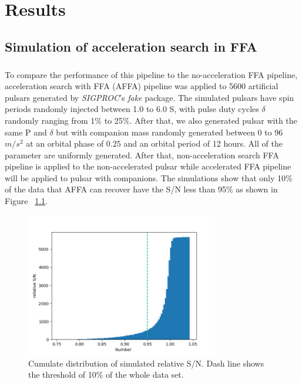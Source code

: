 \documentclass[thesis_msc.tex]{subfiles}
\begin{document}
\chapter{Results}
	\section{Simulation of acceleration search in FFA } \label{AFFA}
  \paragraph{} To compare the performance of this pipeline to the no-acceleration FFA pipeline, acceleration search with FFA (AFFA) pipeline was applied to 5600 artificial pulsars generated by \textit{SIGPROC}'s \textit{fake} package. The simulated pulsars have spin periods randomly injected between 1.0 to 6.0 S, with pulse duty cycles $\delta$ randomly ranging from 1\% to 25\%. After that, we also generated pulsar with the same P and $\delta$ but with companion mass randomly generated between 0 to 96 $m/s^2$ at an orbital phase of 0.25 and an orbital period of 12 hours. All of the parameter are uniformly generated. After that, non-acceleration search FFA pipeline is applied to the non-accelerated pulsar while accelerated FFA pipeline will be applied to pulsar with companions. The simulations show that only 10\% of the data that AFFA can recover have the S/N less than 95\% as shown in Figure ~\ref{his}.
  
  \begin{figure}[h]
\centering
\includegraphics[width=0.75\textwidth]{figures/dist_dash}
\caption{Cumulate distribution of simulated relative S/N.  Dash line shows the threshold  of 10\% of the whole data set. }\label{his}
\end{figure}
\end{document}
